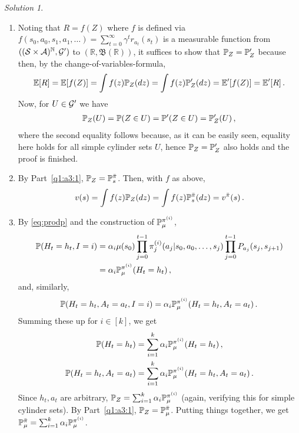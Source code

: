 \documentclass{article}
\newcommand{\R}{\mathbb{R}}
\DeclareMathOperator*{\1}{\mathbbm{1}}
\newcommand{\E}{\mathbb E}
\newcommand{\EE}[1]{\E[#1]}
\newcommand{\0}{\mathbf{0}}
\theoremstyle{definition}
\theoremstyle{remark}
\newtheorem*{solution*}{Solution}
\theoremstyle{theorem}
\newcommand{\cS}{\mathcal{S}}
\newcommand{\cA}{\mathcal{A}}
\begin{document}
\begin{solution*}
\begin{enumerate}
\item
Noting that $R=f(Z)$ where $f$ is defined via
$f(s_0,a_0,s_1,a_1,\dots) = \sum_{t=0}^{\infty} \gamma^t r_{a_t}(s_t)$ is a measurable function from $((\cS\times\cA)^{\N}, \cG')$ to $(\R,\mathfrak{B}(\R))$,
it suffices to show that $\mathbb{P}_Z = \mathbb{P}'_Z$ because then, by the change-of-variables-formula,
\begin{align*}
\EE{R}=\EE{f(Z)}=\int f(z) \PP_Z(dz) = \int f(z) \PP_Z'(dz) = \E'[f(Z)] = \E'[R]\,.
\end{align*}
Now, for $U\in \mathcal{G}'$ we have
\begin{align*}
\mathbb{P}_Z(U) = \mathbb{P}(Z\in U) = \mathbb{P}'(Z\in U) = \mathbb{P}'_Z(U)\,,
\end{align*}
where the second equality follows because, as it can be easily seen, equality here holds
for all simple cylinder sets $U$, hence $\mathbb{P}_Z=\mathbb{P}'_Z$ also holds and the proof is finished.

\item
By Part~\ref{q1:a3:1},  $\mathbb{P}_Z = \mathbb{P}_s^{\bar \pi}$.
Then, with $f$ as above,
\begin{align*}
v(s) = \int f(z) \mathbb{P}_Z(dz) = \int f(z) \mathbb{P}_s^{\bar \pi}(dz) = v^{\bar \pi}(s)\,.
\end{align*}

\item
By \cref{eq:prodp} and the construction of $\mathbb{P}_{\mu}^{\pi^{(i)}}$,
\begin{align*}
\mathbb{P}(H_t=h_t,I=i)
& =
\alpha_i \mu(s_0)
\prod_{j=0}^{t-1} \pi_j^{(i)}(a_j|s_0,a_0,\dots,s_j)
\prod_{j=0}^{t-1} P_{a_j}(s_j,s_{j+1}) \\
& = \alpha_i \mathbb{P}_{\mu}^{\pi^{(i)}}( H_t=h_t)\,,
\end{align*}
and, similarly,
\begin{align*}
\mathbb{P}(H_t=h_t,A_t=a_t,I=i)
 = \alpha_i \mathbb{P}_{\mu}^{\pi^{(i)}}( H_t=h_t,A_t=a_t)\,.
\end{align*}
Summing these up for $i\in [k]$, we get
\begin{align*}
\mathbb{P}(H_t=h_t)  &= \sum_{i=1}^k \alpha_i \mathbb{P}_{\mu}^{\pi^{(i)}}( H_t=h_t)\,,\\
\mathbb{P}(H_t=h_t,A_t=a_t)  &=  \sum_{i=1}^k \alpha_i \mathbb{P}_{\mu}^{\pi^{(i)}}( H_t=h_t,A_t=a_t)\,.
\end{align*}
Since $h_t,a_t$ are arbitrary,
$\mathbb{P}_Z =  \sum_{i=1}^k \alpha_i \mathbb{P}_{\mu}^{\pi^{(i)}}$ (again, verifying this for simple cylinder sets).
By Part~\ref{q1:a3:1},
$\mathbb{P}_Z = \mathbb{P}_\mu^{\bar \pi}$.
Putting things together, we get
$\mathbb{P}_\mu^{\bar \pi} = \sum_{i=1}^k \alpha_i \mathbb{P}_{\mu}^{\pi^{(i)}}$.


\end{enumerate}
\end{solution*}
\end{document}
